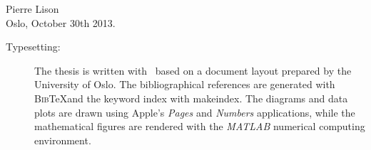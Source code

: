 

\vspace{1cm}

\begin{flushright}
Pierre Lison \\
Oslo, October 30th 2013.
\end{flushright}

\null
\vfill
\begin{description}
\item [Typesetting: ] The thesis is written with \LaTeXe \ based on a document layout prepared by the University of Oslo. The bibliographical references are generated with \textsc{Bib}\negthinspace\TeX and the keyword index with \textsf{makeindex}. The diagrams and data plots are drawn using Apple's \textit{Pages} and \textit{Numbers} applications, while the mathematical figures are rendered with the \textit{MATLAB} numerical computing environment.
\end{description}